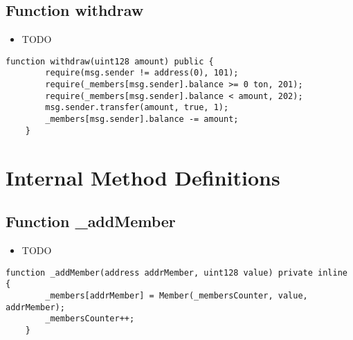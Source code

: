 \subsection{Function withdraw}

\begin{itemize}
\item TODO
\end{itemize}

\begin{lstlisting}[firstnumber=37]
    function withdraw(uint128 amount) public {
        require(msg.sender != address(0), 101);
        require(_members[msg.sender].balance >= 0 ton, 201);
        require(_members[msg.sender].balance < amount, 202);
        msg.sender.transfer(amount, true, 1);
        _members[msg.sender].balance -= amount;
    }
\end{lstlisting}

\section{Internal Method Definitions}


\subsection{Function \_{}addMember}

\begin{itemize}
\item TODO
\end{itemize}

\begin{lstlisting}[firstnumber=32]
    function _addMember(address addrMember, uint128 value) private inline {
        _members[addrMember] = Member(_membersCounter, value, addrMember);
        _membersCounter++;
    }
\end{lstlisting}

